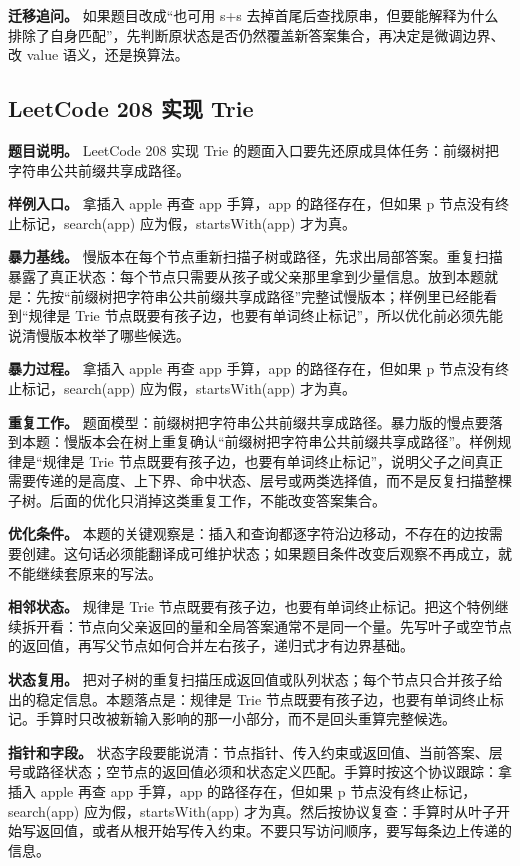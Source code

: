 \textbf{迁移追问。} 如果题目改成“也可用 s+s 去掉首尾后查找原串，但要能解释为什么排除了自身匹配”，先判断原状态是否仍然覆盖新答案集合，再决定是微调边界、改 value 语义，还是换算法。

\subsection{LeetCode 208 实现 Trie}

\textbf{题目说明。} LeetCode 208 实现 Trie 的题面入口要先还原成具体任务：前缀树把字符串公共前缀共享成路径。

\textbf{样例入口。} 拿插入 apple 再查 app 手算，app 的路径存在，但如果 p 节点没有终止标记，search(app) 应为假，startsWith(app) 才为真。

\textbf{暴力基线。} 慢版本在每个节点重新扫描子树或路径，先求出局部答案。重复扫描暴露了真正状态：每个节点只需要从孩子或父亲那里拿到少量信息。放到本题就是：先按“前缀树把字符串公共前缀共享成路径”完整试慢版本；样例里已经能看到“规律是 Trie 节点既要有孩子边，也要有单词终止标记”，所以优化前必须先能说清慢版本枚举了哪些候选。

\textbf{暴力过程。} 拿插入 apple 再查 app 手算，app 的路径存在，但如果 p 节点没有终止标记，search(app) 应为假，startsWith(app) 才为真。

\textbf{重复工作。} 题面模型：前缀树把字符串公共前缀共享成路径。暴力版的慢点要落到本题：慢版本会在树上重复确认“前缀树把字符串公共前缀共享成路径”。样例规律是“规律是 Trie 节点既要有孩子边，也要有单词终止标记”，说明父子之间真正需要传递的是高度、上下界、命中状态、层号或两类选择值，而不是反复扫描整棵子树。后面的优化只消掉这类重复工作，不能改变答案集合。

\textbf{优化条件。} 本题的关键观察是：插入和查询都逐字符沿边移动，不存在的边按需要创建。这句话必须能翻译成可维护状态；如果题目条件改变后观察不再成立，就不能继续套原来的写法。

\textbf{相邻状态。} 规律是 Trie 节点既要有孩子边，也要有单词终止标记。把这个特例继续拆开看：节点向父亲返回的量和全局答案通常不是同一个量。先写叶子或空节点的返回值，再写父节点如何合并左右孩子，递归式才有边界基础。

\textbf{状态复用。} 把对子树的重复扫描压成返回值或队列状态；每个节点只合并孩子给出的稳定信息。本题落点是：规律是 Trie 节点既要有孩子边，也要有单词终止标记。手算时只改被新输入影响的那一小部分，而不是回头重算完整候选。

\textbf{指针和字段。} 状态字段要能说清：节点指针、传入约束或返回值、当前答案、层号或路径状态；空节点的返回值必须和状态定义匹配。手算时按这个协议跟踪：拿插入 apple 再查 app 手算，app 的路径存在，但如果 p 节点没有终止标记，search(app) 应为假，startsWith(app) 才为真。然后按协议复查：手算时从叶子开始写返回值，或者从根开始写传入约束。不要只写访问顺序，要写每条边上传递的信息。

